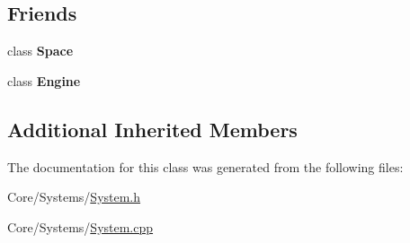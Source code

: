 \subsection*{Friends}
\begin{DoxyCompactItemize}
\item 
\hypertarget{classDCEngine_1_1System_a2129e6c0ac73536a2ac4f681dae16947}{class {\bfseries Space}}\label{classDCEngine_1_1System_a2129e6c0ac73536a2ac4f681dae16947}

\item 
\hypertarget{classDCEngine_1_1System_a3e1914489e4bed4f9f23cdeab34a43dc}{class {\bfseries Engine}}\label{classDCEngine_1_1System_a3e1914489e4bed4f9f23cdeab34a43dc}

\end{DoxyCompactItemize}
\subsection*{Additional Inherited Members}


The documentation for this class was generated from the following files\-:\begin{DoxyCompactItemize}
\item 
Core/\-Systems/\hyperlink{System_8h}{System.\-h}\item 
Core/\-Systems/\hyperlink{System_8cpp}{System.\-cpp}\end{DoxyCompactItemize}
